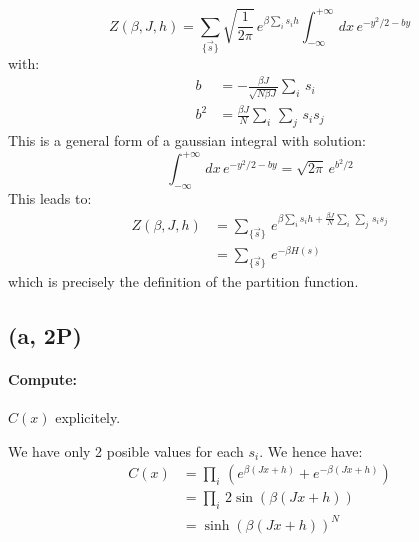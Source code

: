 \documentclass[a4paper]{article}
\begin{document}
\begin{equation}
    Z(\beta,J,h)=\sum_{\{\vec{s}\}}\sqrt{\frac{1}{2 \pi}}\,e^{\beta\sum_i s_i h}\int_{-\infty}^{+\infty}\,dx\,e^{-y^2/2-by}
\end{equation}
with:
\begin{align}
    b&=-\frac{\beta J}{\sqrt{N\beta J}}\sum_i\,s_i \\
    b^2&=\frac{\beta J}{N}\sum_i\,\sum_j\,s_i s_j
\end{align}
This is a general form of a gaussian integral with solution:
\begin{equation}
    \int_{-\infty}^{+\infty}\,dx\,e^{-y^2/2-by}=\sqrt{2 \pi}\,e^{b^2/2}
\end{equation}
This leads to:
\begin{align}
    Z(\beta,J,h)&=\sum_{\{\vec{s}\}}\,e^{\beta\sum_i s_i h+\frac{\beta J}{N}\sum_i\,\sum_j\,s_i s_j} \\
    &=\sum_{\{\vec{s}\}}\,e^{-\beta H(s)}
\end{align}
which is precisely the definition of the partition function.

\subsection{(a, 2P)}
\paragraph{Compute:}

$C(x)$ explicitely.

We have only 2 posible values for each $s_i$. We hence have:
\begin{align}
    C(x)&=\prod\limits_i\,\left( e^{\beta (Jx+h)} + e^{-\beta (Jx+h)} \right) \\
    &=\prod\limits_i\,2 \sin{(\beta (Jx+h))} \\
    &=\sinh{(\beta (Jx+h))}^N
\end{align}
\end{document}
